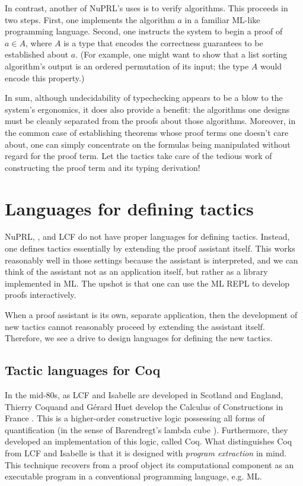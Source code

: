 In contrast, another of NuPRL's uses is to verify algorithms. This proceeds in
two steps.
First, one implements the algorithm $a$ in a familiar ML-like programming
language.
Second, one instructs the system to begin a proof of $a \in A$, where $A$ is a
type that encodes the correctness guarantees to be established about $a$.
(For example, one might want to show that a list sorting algorithm's output is
an ordered permutation of its input; the type $A$ would encode this property.)

In sum, although undecidability of typechecking appears to be a blow to the
system's ergonomics, it does also provide a benefit: the algorithms one designs
must be cleanly separated from the proofs about those algorithms.
Moreover, in the common case of establishing theorems whose proof terms one
doesn't care about, one can simply concentrate on the formulas being manipulated
without regard for the proof term.
Let the tactics take care of the tedious work of constructing the proof term and
its typing derivation!

\section{Languages for defining tactics}
\label{sec:defining-tactics}

NuPRL, \isb, and LCF do not have proper languages for defining tactics.
Instead, one defines tactics essentially by extending the proof assistant
itself.
This works reasonably well in those settings because the assistant is
interpreted, and we can think of the assistant not as an application itself, but
rather as a library implemented in ML.
The upshot is that one can use the ML REPL to develop proofs interactively.

When a proof assistant is its own, separate application, then the development of
new tactics cannot reasonably proceed by extending the assistant itself.
Therefore, we see a drive to design languages for defining the new tactics.

\subsection{Tactic languages for Coq}

In the mid-80s, as LCF and Isabelle are developed in Scotland and England,
Thierry Coquand and Gérard Huet develop the Calculus of Constructions in France
\cite{coc}.
This is a higher-order constructive logic possessing all forms of quantification
(in the sense of Barendregt's lambda cube \cite{barendregt-lambda}).
Furthermore, they developed an implementation of this logic, called
Coq\footnotemark.
What distinguishes Coq from LCF and Isabelle is that it is designed with
\emph{program extraction} in mind.
This technique recovers from a proof object its computational component as an
executable program in a conventional programming language, e.g. ML.
%

